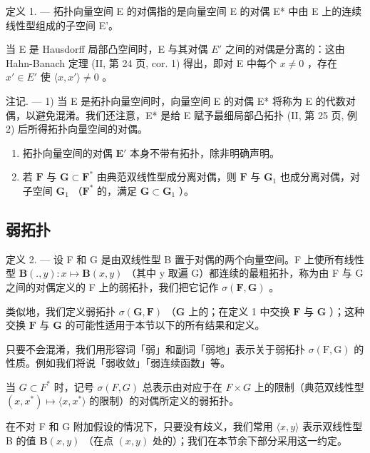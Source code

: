 定义 1. --- 拓扑向量空间 E 的对偶指的是向量空间 E 的对偶 E* 中由 E 上的连续线性型组成的子空间 E'。

当 E 是 Hausdorff 局部凸空间时，E 与其对偶 \(E'\) 之间的对偶是分离的：这由 Hahn-Banach 定理 (II, 第 24 页, cor. 1) 得出，即对 E 中每个 \(x \neq 0\) ，存在 \(x' \in E'\) 使 \(\langle x, x' \rangle \neq 0\) 。

注记. --- 1) 当 E 是拓扑向量空间时，向量空间 E 的对偶 E* 将称为 E 的代数对偶，以避免混淆。我们还注意，E* 是给 E 赋予最细局部凸拓扑 (II, 第 25 页, 例 2) 后所得拓扑向量空间的对偶。

\begin{enumerate}
\def\labelenumi{\arabic{enumi})}
\setcounter{enumi}{1}
\item
  拓扑向量空间的对偶 \(\mathbf{E}'\) 本身不带有拓扑，除非明确声明。
\item
  若 \(\mathbf{F}\) 与 \(\mathbf{G} \subset \mathbf{F}^*\) 由典范双线性型成分离对偶，则 \(\mathbf{F}\) 与 \(\mathbf{G}_1\) 也成分离对偶，对子空间 \(\mathbf{G}_1\) （\(\mathbf{F}^*\) 的，满足 \(\mathbf{G} \subset \mathbf{G}_1\) ）。
\end{enumerate}

\subsection{弱拓扑}

定义 2. --- 设 F 和 G 是由双线性型 B 置于对偶的两个向量空间。F 上使所有线性型 \(\mathbf{B}(., y): x \mapsto \mathbf{B}(x, y)\) （其中 y 取遍 G）都连续的最粗拓扑，称为由 F 与 G 之间的对偶定义的 F 上的弱拓扑，我们把它记作 \(\sigma(\mathbf{F}, \mathbf{G})\) 。

类似地，我们定义弱拓扑 \(\sigma(\mathbf{G},\mathbf{F})\) （\(\mathbf{G}\) 上的；在定义 1 中交换 \(\mathbf{F}\) 与 \(\mathbf{G}\) ）；这种交换 \(\mathbf{F}\) 与 \(\mathbf{G}\) 的可能性适用于本节以下的所有结果和定义。

只要不会混淆，我们用形容词「弱」和副词「弱地」表示关于弱拓扑 \(\sigma(\mathrm{F},\mathrm{G})\) 的性质。例如我们将说「弱收敛」「弱连续函数」等。

当 \(G \subset F^{*}\) 时，记号 \(\sigma(F, G)\) 总表示由对应于在 \(F \times G\) 上的限制（典范双线性型 \((x, x^{*}) \mapsto \langle x, x^{*} \rangle\) 的限制）的对偶所定义的弱拓扑。

在不对 F 和 G 附加假设的情况下，只要没有歧义，我们常用 \(\langle x, y \rangle\) 表示双线性型 B 的值 \(\mathbf{B}(x, y)\) （在点 \((x, y)\) 处的）；我们在本节余下部分采用这一约定。

